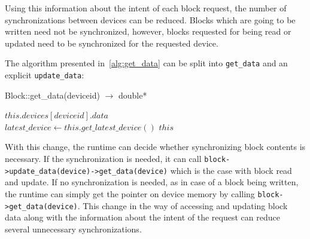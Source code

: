 Using this information about the intent of each block request, the
number of synchronizations between devices can be reduced. Blocks which are
going to be written need not be synchronized, however, blocks requested for
being read or updated need to be synchronized for the requested device.

The algorithm presented in~\ref{alg:get_data} can be split into
\texttt{get\_data} and an explicit \texttt{update\_data}:

\begin{algorithm}  {Block::get\_data(deviceid) $\rightarrow$ double*}
  \singlespacing

  \begin{algorithmic}[1]
    \State \Return $this.devices[deviceid].data$
    \EndFunction
    \\
    \State $latest\_device \gets this.get\_latest\_device()$
    \EndIf
    \State \Return $this$
    \EndFunction
  \end{algorithmic}
\end{algorithm}

With this change, the runtime can decide whether synchronizing block contents
is necessary. If the synchronization is needed, it can call
\texttt{block\-->update\_data(device)\-->get\_data(device)}
which is the case with block read and update. If no synchronization is needed, as in case
of a block being written, the runtime can simply get the pointer on device memory by calling
\texttt{block->get\_data(device)}.
This change in the way of accessing and updating block data along with the information
about the intent of the request can reduce several unnecessary synchronizations.

